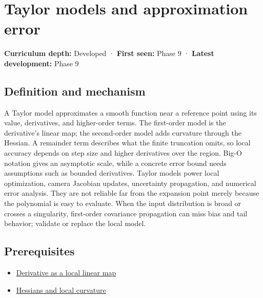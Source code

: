 \hypertarget{appendix-32f39e9a3738}{}\label{referencestart:appendix-32f39e9a3738}
\section{Taylor models and approximation error}\label{appendix-32f39e9a3738-taylor-models-and-approximation-error}

\hypertarget{appendix-32f39e9a3738-taylor-models-and-approximation-error}{}

\textbf{Curriculum depth:} Developed · \textbf{First seen:} Phase 9 · \textbf{Latest development:} Phase 9

\begin{allmightroledefinition}

\subsection{Definition and mechanism}\label{appendix-32f39e9a3738-definition-and-mechanism}

\hypertarget{appendix-32f39e9a3738-definition-and-mechanism}{}

A Taylor model approximates a smooth function near a reference point using its value, derivatives, and higher-order terms. The first-order model is the derivative's linear map; the second-order model adds curvature through the Hessian. A remainder term describes what the finite truncation omits, so local accuracy depends on step size and higher derivatives over the region. Big-O notation gives an asymptotic scale, while a concrete error bound needs assumptions such as bounded derivatives. Taylor models power local optimization, camera Jacobian updates, uncertainty propagation, and numerical error analysis. They are not reliable far from the expansion point merely because the polynomial is easy to evaluate. When the input distribution is broad or crosses a singularity, first-order covariance propagation can miss bias and tail behavior; validate or replace the local model.

\end{allmightroledefinition}

\subsection{Prerequisites}\label{appendix-32f39e9a3738-prerequisites}

\hypertarget{appendix-32f39e9a3738-prerequisites}{}

\begin{itemize}
\tightlist
\item
  \hyperref[appendix-7bc181935c42]{Derivative as a local linear map}
\item
  \hyperref[appendix-6ac071f8b50c]{Hessians and local curvature}
\end{itemize}

